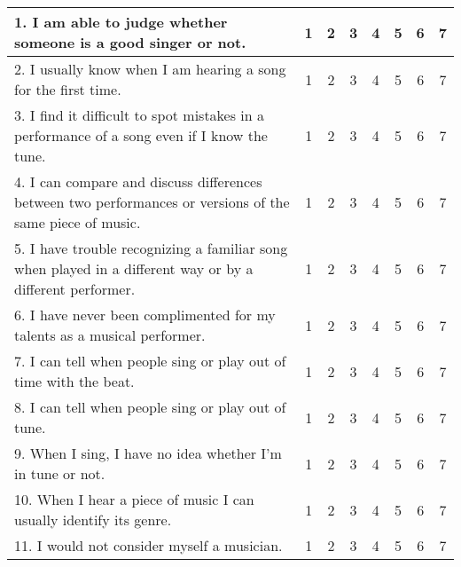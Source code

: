 \documentclass[12pt, a4paper]{article}
\begin{document}
\begin{enumerate}
\vspace{8pt}

\begin{tabular}{|m{10cm}|c|c|c|c|c|c|c|}
\hline
1. I am able to judge whether someone is a good singer or not. & 1 & 2 & 3 & 4 & 5 & 6 & 7 \\ \hline
2. I usually know when I am hearing a song for the first time. & 1 & 2 & 3 & 4 & 5 & 6 & 7 \\ \hline
3. I find it difficult to spot mistakes in a performance of a song even if I know the tune. & 1 & 2 & 3 & 4 & 5 & 6 & 7 \\ \hline
4. I can compare and discuss differences between two performances or versions of the same piece of music. & 1 & 2 & 3 & 4 & 5 & 6 & 7 \\ \hline
5. I have trouble recognizing a familiar song when played in a different way or by a different performer. & 1 & 2 & 3 & 4 & 5 & 6 & 7 \\ \hline
6. I have never been complimented for my talents as a musical performer. & 1 & 2 & 3 & 4 & 5 & 6 & 7 \\ \hline
7. I can tell when people sing or play out of time with the beat. & 1 & 2 & 3 & 4 & 5 & 6 & 7 \\ \hline
8. I can tell when people sing or play out of tune. & 1 & 2 & 3 & 4 & 5 & 6 & 7 \\[5pt] \hline
9. When I sing, I have no idea whether I'm in tune or not. & 1 & 2 & 3 & 4 & 5 & 6 & 7 \\ \hline
10. When I hear a piece of music I can usually identify its genre. & 1 & 2 & 3 & 4 & 5 & 6 & 7 \\ \hline
11. I would not consider myself a musician. & 1 & 2 & 3 & 4 & 5 & 6 & 7 \\[5pt] \hline
\end{tabular}

\vspace{10pt}
\end{enumerate}
\end{document}
